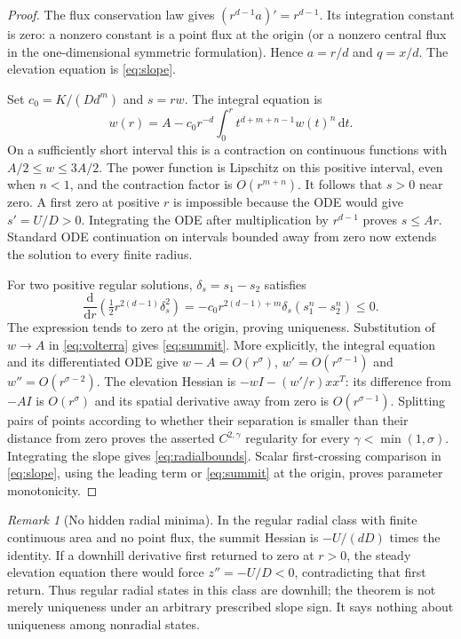 \documentclass[11pt,a4paper]{article}
\theoremstyle{definition}\newtheorem{definition}[theorem]{Definition}
\theoremstyle{remark}\newtheorem{remark}[theorem]{Remark}
\newcommand{\dd}{\,\mathrm d}
\begin{document}
\begin{proof}
The flux conservation law gives $(r^{d-1}a)'=r^{d-1}$. Its integration constant is zero: a nonzero constant is a point flux at the origin (or a nonzero central flux in the one-dimensional symmetric formulation). Hence $a=r/d$ and $q=x/d$. The elevation equation is \eqref{eq:slope}.

Set $c_0=K/(Dd^m)$ and $s=rw$. The integral equation is
\begin{equation}
 w(r)=A-c_0r^{-d}\int_0^r t^{d+m+n-1}w(t)^n\dd t.\label{eq:volterra}
\end{equation}
On a sufficiently short interval this is a contraction on continuous functions with $A/2\leq w\leq3A/2$. The power function is Lipschitz on this positive interval, even when $n<1$, and the contraction factor is $O(r^{m+n})$. It follows that $s>0$ near zero. A first zero at positive $r$ is impossible because the ODE would give $s'=U/D>0$. Integrating the ODE after multiplication by $r^{d-1}$ proves $s\leq Ar$. Standard ODE continuation on intervals bounded away from zero now extends the solution to every finite radius.

For two positive regular solutions, $\delta_s=s_1-s_2$ satisfies
\[
 \frac{\mathrm d}{\mathrm dr}\left(\tfrac12r^{2(d-1)}\delta_s^2\right)
 =-c_0r^{2(d-1)+m}\delta_s(s_1^n-s_2^n)\leq0.
\]
The expression tends to zero at the origin, proving uniqueness. Substitution of $w\to A$ in \eqref{eq:volterra} gives \eqref{eq:summit}. More explicitly, the integral equation and its differentiated ODE give $w-A=O(r^\sigma)$, $w'=O(r^{\sigma-1})$ and $w''=O(r^{\sigma-2})$. The elevation Hessian is $-wI-(w'/r)xx^T$: its difference from $-AI$ is $O(r^\sigma)$ and its spatial derivative away from zero is $O(r^{\sigma-1})$. Splitting pairs of points according to whether their separation is smaller than their distance from zero proves the asserted $C^{2,\gamma}$ regularity for every $\gamma<\min(1,\sigma)$. Integrating the slope gives \eqref{eq:radialbounds}. Scalar first-crossing comparison in \eqref{eq:slope}, using the leading term or \eqref{eq:summit} at the origin, proves parameter monotonicity.
\end{proof}

\begin{remark}[No hidden radial minima]
In the regular radial class with finite continuous area and no point flux, the summit Hessian is $-U/(dD)$ times the identity. If a downhill derivative first returned to zero at $r>0$, the steady elevation equation there would force $z''=-U/D<0$, contradicting that first return. Thus regular radial states in this class are downhill; the theorem is not merely uniqueness under an arbitrary prescribed slope sign. It says nothing about uniqueness among nonradial states.
\end{remark}
\end{document}
